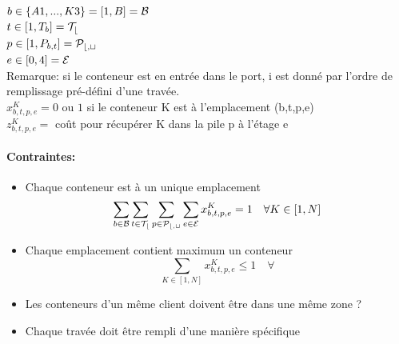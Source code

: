 \documentclass{article}
\begin{document}
$b\in\{A1,...,K3\} = [1,B] = \cal{B}$ \\
$t\in[1,T_b] = \cal{T}_b$ \\
$p\in[1,P_{b,t}] = \cal{P}_{b,t}$ \\
$e\in[0,4] = \cal{E}$ \\


Remarque: si le conteneur est en entrée dans le port, i est donné par l'ordre de remplissage pré-défini d'une travée. \\


$x^K_{b,t,p,e} = 0$ ou $1$ si le conteneur K est à l'emplacement (b,t,p,e) \\
$z^K_{b,t,p,e} = $ coût pour récupérer K dans la pile p à l'étage e



\paragraph{Contraintes:}

\begin{itemize}

\item Chaque conteneur est à un unique emplacement
$$
\sum_{b\in\cal{B}} \sum_{t\in\cal{T}_b} \sum_{p\in\cal{P}_{b,t}} \sum_{e\in\cal{E}}
x^K_{b,t,p,e} = 1 \quad \forall K\in[1,N]
$$ 
\item Chaque emplacement contient maximum un conteneur
$$
\sum_{K\in[1,N]} x^K_{b,t,p,e} \le 1 \quad \forall
$$
\item Les conteneurs d'un même client doivent être dans une même zone ?

\item Chaque travée doit être rempli d'une manière spécifique
\end{itemize}
\end{document}
